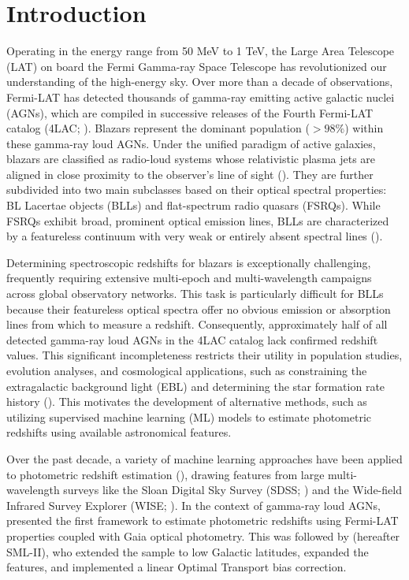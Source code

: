 \documentclass[twocolumn,linenumbers,floatfix]{aastex701}
\begin{document}

\section{Introduction}
Operating in the energy range from 50 MeV to 1 TeV, the Large Area Telescope (LAT) on board the Fermi Gamma-ray Space Telescope has revolutionized our understanding of the high-energy sky. Over more than a decade of observations, Fermi-LAT has detected thousands of gamma-ray emitting active galactic nuclei (AGNs), which are compiled in successive releases of the Fourth Fermi-LAT catalog (4LAC; \citealt{Abdollahi2020, Ajello2020}). Blazars represent the dominant population ($>98\%$) within these gamma-ray loud AGNs. Under the unified paradigm of active galaxies, blazars are classified as radio-loud systems whose relativistic plasma jets are aligned in close proximity to the observer's line of sight (\citealt{Blandford2019}). They are further subdivided into two main subclasses based on their optical spectral properties: BL Lacertae objects (BLLs) and flat-spectrum radio quasars (FSRQs). While FSRQs exhibit broad, prominent optical emission lines, BLLs are characterized by a featureless continuum with very weak or entirely absent spectral lines (\citealt{Ghisellini2011, Madejski2016}).

Determining spectroscopic redshifts for blazars is exceptionally challenging, frequently requiring extensive multi-epoch and multi-wavelength campaigns across global observatory networks. This task is particularly difficult for BLLs because their featureless optical spectra offer no obvious emission or absorption lines from which to measure a redshift. Consequently, approximately half of all detected gamma-ray loud AGNs in the 4LAC catalog lack confirmed redshift values. This significant incompleteness restricts their utility in population studies, evolution analyses, and cosmological applications, such as constraining the extragalactic background light (EBL) and determining the star formation rate history (\citealt{Ackermann2012, Singal2015, Dominguez2019}). This motivates the development of alternative methods, such as utilizing supervised machine learning (ML) models to estimate photometric redshifts using available astronomical features.

Over the past decade, a variety of machine learning approaches have been applied to photometric redshift estimation (\citealt{Cavuoti2014, Jones2017, Yang2017, Brescia2019, Nakoneczny2020}), drawing features from large multi-wavelength surveys like the Sloan Digital Sky Survey (SDSS; \citealt{Aihara2011}) and the Wide-field Infrared Survey Explorer (WISE; \citealt{Wright2010}). In the context of gamma-ray loud AGNs, \citet{Dainotti2021} presented the first framework to estimate photometric redshifts using Fermi-LAT properties coupled with Gaia optical photometry. This was followed by \citet{Narendra2022} (hereafter SML-II), who extended the sample to low Galactic latitudes, expanded the features, and implemented a linear Optimal Transport bias correction.
\end{document}
